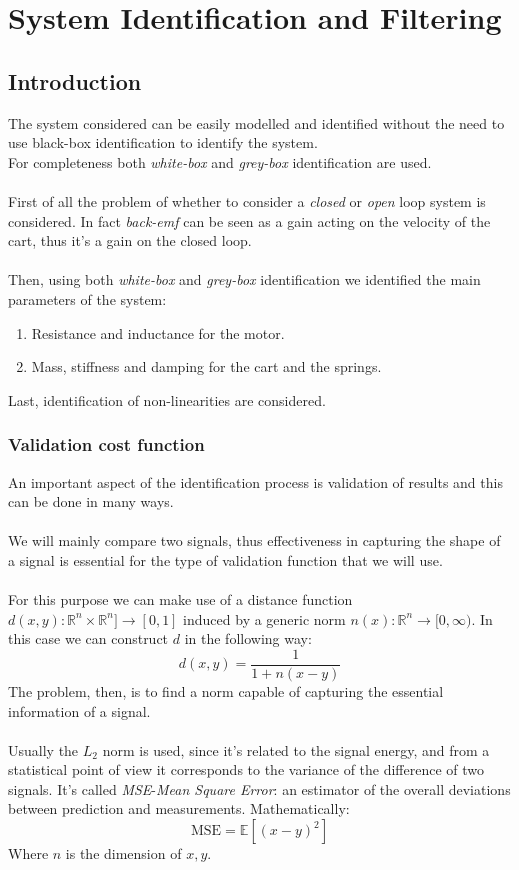\part{System Identification and Filtering}
\chapter{Introduction}
The system considered can be easily modelled and identified without the need to use black-box identification to identify the system. \\ For completeness both \emph{white-box} and \emph{grey-box} identification are used.\\ \\
First of all the problem of whether to consider a \emph{closed} or \emph{open} loop system is considered. In fact \emph{back-emf} can be seen as a gain acting on the velocity of the cart, thus it's a gain on the closed loop.\\ \\
Then, using both \emph{white-box} and \emph{grey-box} identification we identified the main parameters of the system: 
\begin{enumerate}
\item Resistance and inductance for the motor.
\item Mass, stiffness and damping for the cart and the springs.
\end{enumerate}
Last, identification of non-linearities are considered.
\section{Validation cost function}
\label{sec:validation_cost_function}
An important aspect of the identification process is validation of results and this can be done in many ways. \\ \\
We will mainly compare two signals, thus effectiveness in capturing the shape of  a signal is essential for the type of validation function that we will use. \\  \\
For this purpose we can make use of a distance function $d(x,y): \mathbb{R}^n \times \mathbb{R}^n]\to [0,1]$ induced by a generic norm $n(x) : \mathbb{R}^n \to [0,\infty)$. In this case we can construct $d$ in the following way:
$$d(x,y) = \frac{1}{1+n(x-y)}$$
 The problem, then, is to find a norm capable of capturing the essential information of a signal. \\ \\Usually the $L_2$ norm is used, since it's related to the signal energy, and from a statistical point of view it corresponds to the variance of the difference of two signals. It's called \emph{MSE}-\emph{Mean Square Error}: an estimator of the overall deviations between prediction and measurements. Mathematically:
$$\text{MSE} =  \mathbb{E}[(x-y)^2]$$
Where $n$ is the dimension of $x,y$.

